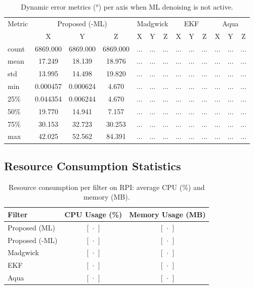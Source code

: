 \documentclass{iutbscthesis}
\begin{document}
\begin{table}[H]
\centering
\caption{Dynamic error metrics (°) per axis when ML denoising is not active.}
\label{tab:dynamic_no_ml}
\begin{tabular}{l
  *{4}{ccc}
}
\toprule
Metric & \multicolumn{3}{c}{Proposed (-ML)} & \multicolumn{3}{c}{Madgwick} & \multicolumn{3}{c}{EKF} & \multicolumn{3}{c}{Aqua} \\
 & X & Y & Z & X & Y & Z & X & Y & Z & X & Y & Z \\
\midrule
count & 6869.000 & 6869.000 & 6869.000 & ... & ... & ... & ... & ... & ... & ... & ... & ... \\
mean & 17.249 & 18.139 & 18.976 & ... & ... & ... & ... & ... & ... & ... & ... & ... \\
std & 13.995 & 14.498 & 19.820 & ... & ... & ... & ... & ... & ... & ... & ... & ... \\
min & 0.000457 & 0.000624 & 4.670 & ... & ... & ... & ... & ... & ... & ... & ... & ... \\
25\% & 0.044354 & 0.006244 & 4.670 & ... & ... & ... & ... & ... & ... & ... & ... & ... \\
50\% & 19.770 & 14.941 & 7.157 & ... & ... & ... & ... & ... & ... & ... & ... & ... \\
75\% & 30.153 & 32.723 & 30.253 & ... & ... & ... & ... & ... & ... & ... & ... & ... \\
max & 42.025 & 52.562 & 84.391 & ... & ... & ... & ... & ... & ... & ... & ... & ... \\
\bottomrule
\end{tabular}
\end{table}


\subsection{Resource Consumption Statistics}
\begin{table}[H]
  \centering
  \caption{Resource consumption per filter on RPI: average CPU (\%) and memory (MB).}
  \label{tab:resource_consumption}
  \begin{tabular}{lcc}
    \toprule
    Filter & CPU Usage (\%) & Memory Usage (MB) \\
    \midrule
    Proposed (ML)     & \([\,\cdot\,]\) & \([\,\cdot\,]\) \\
    Proposed (-ML)    & \([\,\cdot\,]\) & \([\,\cdot\,]\) \\
    Madgwick           & \([\,\cdot\,]\) & \([\,\cdot\,]\) \\
    EKF                & \([\,\cdot\,]\) & \([\,\cdot\,]\) \\
    Aqua               & \([\,\cdot\,]\) & \([\,\cdot\,]\) \\
    \bottomrule
  \end{tabular}
\end{table}
\end{document}
